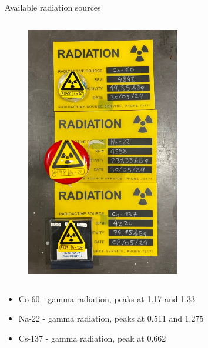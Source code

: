 \begin{columnframe}{Available radiation sources}
    \begin{column}{0.5\textwidth}
        \begin{figure}
            \centering
            \includegraphics[width=0.6\textwidth, frame]{images/radioactive_sources.png}
        \end{figure}
    \end{column}
    \begin{column}{0.5\textwidth}
        \begin{itemize}
            \item Co-60 - gamma radiation, peaks at 1.17 and 1.33 \MeV
            \item Na-22 - gamma radiation, peaks at 0.511 \MeV and 1.275 \MeV
            \item Cs-137 - gamma radiation, peak at 0.662 \MeV
        \end{itemize}
    \end{column}
\end{columnframe}

